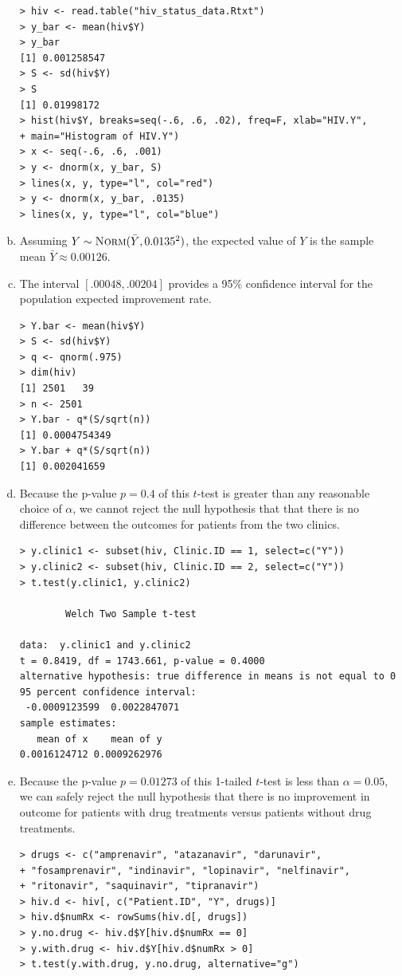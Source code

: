 \documentclass[a4paper, 10pt]{article}
\begin{document}
\begin{enumerate}[(a)]
\begin{verbatim}
> hiv <- read.table("hiv_status_data.Rtxt")
> y_bar <- mean(hiv$Y)
> y_bar
[1] 0.001258547
> S <- sd(hiv$Y)
> S
[1] 0.01998172
> hist(hiv$Y, breaks=seq(-.6, .6, .02), freq=F, xlab="HIV.Y",
+ main="Histogram of HIV.Y")
> x <- seq(-.6, .6, .001)
> y <- dnorm(x, y_bar, S)
> lines(x, y, type="l", col="red")
> y <- dnorm(x, y_bar, .0135)
> lines(x, y, type="l", col="blue")
\end{verbatim}

\item Assuming $Y \sim \textsc{Norm}(\bar{Y}, 0.0135^2)$, the expected value of $Y$ is the sample mean $\bar{Y} \approx 0.00126$.
\item The interval $[.00048, .00204]$ provides a 95\% confidence interval for the population expected improvement rate.
\begin{verbatim}
> Y.bar <- mean(hiv$Y)
> S <- sd(hiv$Y)
> q <- qnorm(.975)
> dim(hiv)
[1] 2501   39
> n <- 2501
> Y.bar - q*(S/sqrt(n))
[1] 0.0004754349
> Y.bar + q*(S/sqrt(n))
[1] 0.002041659
\end{verbatim}

\item Because the p-value $p = 0.4$ of this $t$-test is greater than any reasonable choice of $\alpha$, we cannot reject the null hypothesis that that there is no difference between the outcomes for patients from the two clinics.

\begin{verbatim}
> y.clinic1 <- subset(hiv, Clinic.ID == 1, select=c("Y"))
> y.clinic2 <- subset(hiv, Clinic.ID == 2, select=c("Y"))
> t.test(y.clinic1, y.clinic2)

        Welch Two Sample t-test

data:  y.clinic1 and y.clinic2 
t = 0.8419, df = 1743.661, p-value = 0.4000
alternative hypothesis: true difference in means is not equal to 0 
95 percent confidence interval:
 -0.0009123599  0.0022847071 
sample estimates:
   mean of x    mean of y 
0.0016124712 0.0009262976
\end{verbatim}

\item Because the p-value $p = 0.01273$ of this 1-tailed 	$t$-test is less than $\alpha = 0.05$, we can safely reject the null hypothesis that there is no improvement in outcome for patients with drug treatments versus patients without drug treatments.
\begin{verbatim}
> drugs <- c("amprenavir", "atazanavir", "darunavir",
+ "fosamprenavir", "indinavir", "lopinavir", "nelfinavir",
+ "ritonavir", "saquinavir", "tipranavir")
> hiv.d <- hiv[, c("Patient.ID", "Y", drugs)]
> hiv.d$numRx <- rowSums(hiv.d[, drugs])
> y.no.drug <- hiv.d$Y[hiv.d$numRx == 0]
> y.with.drug <- hiv.d$Y[hiv.d$numRx > 0]
> t.test(y.with.drug, y.no.drug, alternative="g")


\end{verbatim}
\end{enumerate}
\end{document}
